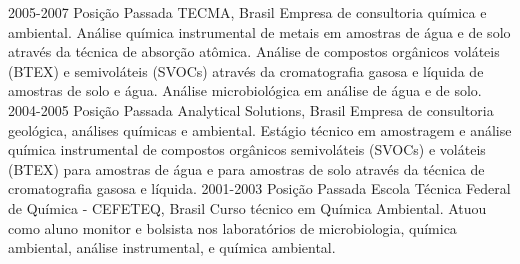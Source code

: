 \documentclass[letterpaper]{twentyonesecondcv} %
\begin{document}
{\begin{twenty}
        \twentyitem
        {2005-2007}
        {Posição Passada}
        {TECMA, Brasil}
	    {Empresa de consultoria química e ambiental. Análise química instrumental de metais em amostras de água e de solo através da técnica de absorção atômica. Análise de compostos orgânicos voláteis (BTEX) e semivoláteis (SVOCs) através da cromatografia gasosa e líquida de amostras de solo e água. Análise microbiológica em análise de água e de solo.}
        \twentyitem
        {2004-2005}
        {Posição Passada}
        {Analytical Solutions, Brasil}
	    {Empresa de consultoria geológica, análises químicas e ambiental. Estágio técnico em amostragem e análise química instrumental de compostos orgânicos semivoláteis (SVOCs) e voláteis (BTEX) para amostras de água e para amostras de  solo através da técnica de cromatografia gasosa e líquida.}
        \twentyitem
        {2001-2003}
        {Posição Passada}
        {Escola Técnica Federal de Química - CEFETEQ, Brasil}
        {Curso técnico em Química Ambiental. Atuou como aluno monitor e bolsista nos laboratórios de microbiologia, química ambiental, análise instrumental, e química ambiental.}
        
        \end{twenty}
    
}
    


\clearpage  %
\end{document}
